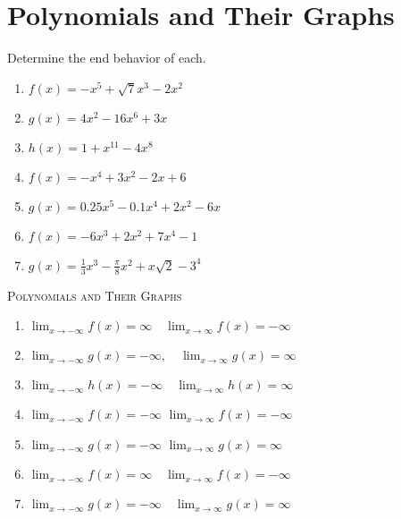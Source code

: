 \chapter{Polynomials and Their Graphs}
\everymath{\displaystyle}

Determine the end behavior of each.
\begin{enumerate}
\item $f(x) = -x^5 + \sqrt{7}x^3 - 2x^2$
\item $g(x) = 4x^2 - 16x^6 + 3x$
\item $h(x) = 1 + x^{11} - 4x^8$
\item $f(x) = -x^4+3x^2-2x+6$
\item $g(x) = 0.25x^5-0.1x^4+2x^2-6x$
\item $f(x) = -6x^3 + 2x^2 + 7x^4 - 1$
\item $g(x) = \frac{1}{3}x^3 - \frac{\pi}{8}x^2 + x\sqrt{2} - 3^4$
\end{enumerate}

\newpage

\textsc{Polynomials and Their Graphs}

\begin{enumerate}
	\item $\lim_{x \to -\infty} f(x) = \infty \quad \lim_{x \to \infty}f(x) = -\infty$
	\item $\lim_{x \to -\infty} g(x) = -\infty, \quad \lim_{x \to \infty}g(x) = \infty$
	\item $\lim_{x \to -\infty} h(x) = -\infty \quad \lim_{x \to \infty}h(x) =\infty$
	\item $\lim_{x \to -\infty}f(x) = -\infty$ \quad $\lim_{x \to \infty}f(x) = -\infty$
    \item $\lim_{x \to -\infty}g(x) = -\infty$ \quad $\lim_{x \to \infty}g(x) = \infty$
    \item $\lim_{x \to -\infty} f(x) = \infty \quad \lim_{x \to \infty} f(x) = - \infty$
    \item $\lim_{x \to -\infty} g(x) = -\infty \quad \lim_{x \to \infty} g(x) = \infty$
\end{enumerate}